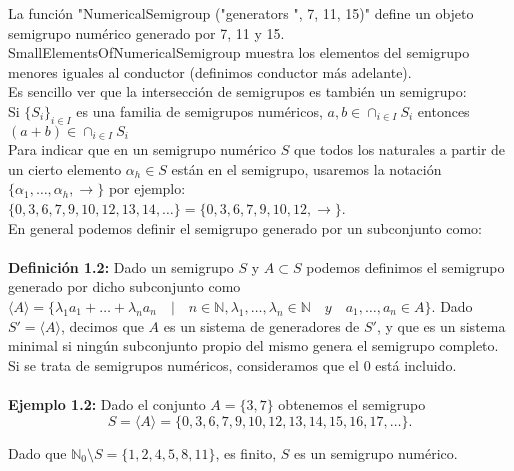 \documentclass[11pt,spanish]{book}
\begin{document}
La función "NumericalSemigroup ("generators ", 7, 11, 15)" define un objeto semigrupo numérico generado por 7, 11 y 15.\\

SmallElementsOfNumericalSemigroup muestra los elementos del semigrupo menores iguales al conductor (definimos conductor más adelante).\\

Es sencillo ver que la intersección de semigrupos es también un semigrupo:\\
Si $\{S_{i}\}_{i\in I}$ es una familia de semigrupos numéricos, $a, b \in\cap_{i\in I} S_{i}$ entonces  $(a+b)\in \cap_{i\in I} S_{i}$\\

Para indicar que en un semigrupo numérico $S$ que todos los naturales a partir de un cierto elemento $\alpha_{h}\in S$ están en el semigrupo, usaremos la notación $\{\alpha_{1},\ldots,\alpha_{h},\rightarrow\}$ por ejemplo: $\{0,3,6,7,9,10,12,13,14,\ldots\}=\{0,3,6,7,9,10,12,\rightarrow \}$.\\
En general podemos definir el semigrupo generado por un subconjunto como:\\
\\ \textbf{Definición 1.2:} Dado un semigrupo $S$ y $A\subset S$ podemos definimos el semigrupo generado por dicho subconjunto como $\langle A\rangle=\{\lambda_{1}a_{1}+\ldots+\lambda_{n}a_{n}\quad |\quad n\in\mathbb{N}, \lambda_{1},\ldots,\lambda_{n}\in\mathbb{N}\quad y \quad a_{1},\ldots,a_{n}\in A\}$. Dado $S'=\langle A\rangle$, decimos que $A$ es un sistema de generadores de $S'$, y que es un sistema minimal si ningún subconjunto propio del mismo genera el semigrupo completo. Si se trata de semigrupos numéricos, consideramos que el $0$ está incluido.\\
\\ \textbf{Ejemplo 1.2: }	Dado el conjunto $A=\{3,7\}$ obtenemos el semigrupo 
$$S=\langle A\rangle =\{0,3,6,7,9,10,12,13,14,15,16,17,\ldots\}.$$

Dado que $\mathbb{N}_0\setminus S= \{1,2,4,5,8,11\}$, es finito, $S$ es un semigrupo numérico.\\
\end{document}
